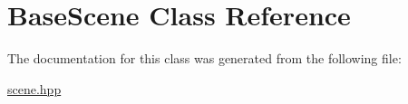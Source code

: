 \hypertarget{class_base_scene}{}\section{Base\+Scene Class Reference}
\label{class_base_scene}


The documentation for this class was generated from the following file\+:\begin{DoxyCompactItemize}
\item 
\mbox{\hyperlink{scene_8hpp}{scene.\+hpp}}\end{DoxyCompactItemize}
